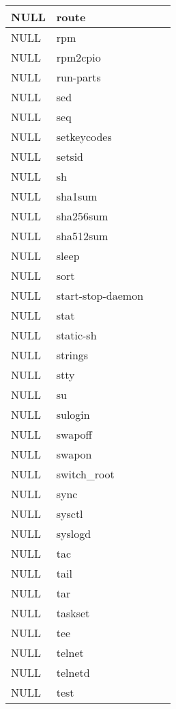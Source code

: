 \begin{longtable}{llp{60mm}p{60mm}}
     \hline
      NULL& route \\
     \hline
      NULL& rpm \\
     \hline
      NULL& rpm2cpio \\
     \hline
      NULL& run-parts \\
     \hline
      NULL& sed \\
     \hline
      NULL& seq \\
     \hline
      NULL& setkeycodes \\
     \hline
      NULL& setsid \\
     \hline
      NULL& sh \\
     \hline
      NULL& sha1sum \\
     \hline
      NULL& sha256sum \\
     \hline
      NULL& sha512sum \\
     \hline
      NULL& sleep \\
     \hline
      NULL& sort \\
     \hline
      NULL& start-stop-daemon \\
     \hline
      NULL& stat \\
     \hline
      NULL& static-sh \\
     \hline
      NULL& strings \\
     \hline
      NULL& stty \\
     \hline
      NULL& su \\
     \hline
      NULL& sulogin \\
     \hline
      NULL& swapoff \\
     \hline
      NULL& swapon \\
     \hline
      NULL& switch_root \\
     \hline
      NULL& sync \\
     \hline
      NULL& sysctl \\
     \hline
      NULL& syslogd \\
     \hline
      NULL& tac \\
     \hline
      NULL& tail \\
     \hline
      NULL& tar \\
     \hline
      NULL& taskset \\
     \hline
      NULL& tee \\
     \hline
      NULL& telnet \\
     \hline
      NULL& telnetd \\
     \hline
      NULL& test \\
     \hline

\end{longtable}
